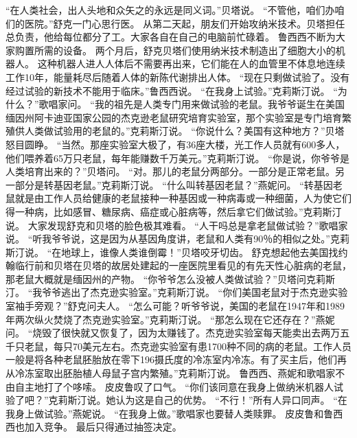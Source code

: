 \documentclass[a4paper,12pt,UTF8,twoside]{ctexbook}
\begin{document}
        “在人类社会，出人头地和众矢之的永远是同义词。”贝塔说。  
        “不管他，咱们办咱们的医院。”舒克一门心思行医。  
        从第二天起，朋友们开始攻纳米技术。贝塔担任总负责，他给每位都分了工。大家各自在自己的电脑前忙碌着。  
        鲁西西不断为大家购置所需的设备。  
        两个月后，舒克贝塔们使用纳米技术制造出了细胞大小的机器人。  
        这种机器人进人人体后不需要再出来，它们能在人的血管里不体息地连续工作10年，能量耗尽后随着人体的新陈代谢排出人体。  
        “现在只剩做试验了。没有经过试验的新技术不能用于临床。”鲁西西说。        
        “在我身上试验。”克莉斯汀说。  
        “为什么？”歌唱家问。  
        “我的祖先是人类专门用来做试验的老鼠。我爷爷诞生在美国缅因州阿卡迪亚国家公园的杰克逊老鼠研究培育实验室，那个实验室是专门培育繁殖供人类做试验用的老鼠的。”克莉斯汀说。  
        “你说什么？美国有这种地方？”贝塔怒目圆睁。  
        “当然。那座实验室大极了，有36座大楼，光工作人员就有600多人，他们喂养着65万只老鼠，每年能赚数千万美元。”克莉斯汀说。  
        “你是说，你爷爷是人类培育出来的？”贝塔问。  
        “对。那儿的老鼠分两部分。一部分是正常老鼠。另一部分是转基因老鼠。”克莉斯汀说。  
        “什么叫转基因老鼠？”燕妮问。  
        “转基因老鼠就是由工作人员给健康的老鼠接种一种基因或一种病毒或一种细菌，人为使它们得一种病，比如感冒、糖尿病、癌症或心脏病等，然后拿它们做试验。”克莉斯汀说。  
        大家发现舒克和贝塔的脸色极其难看。  
        “人干吗总是拿老鼠做试验？”歌唱家说。  
        “听我爷爷说，这是因为从基因角度讲，老鼠和人类有90％的相似之处。”克莉斯汀说。  
        “在地球上，谁像人类谁倒霉！”贝塔咬牙切齿。  
        舒克想起他去美国找约翰临行前和贝塔在贝塔的故居处建起的一座医院里看见的有先天性心脏病的老鼠，那老鼠大概就是缅因州的产物。  
        “你爷爷怎么没被人类做试验？”贝塔问克莉斯汀。  
        “我爷爷逃出了杰克逊实验室。”克莉斯汀说。  
        “你们美国老鼠对于杰克逊实验室袖手旁观？”舒克问夫人。  
        “怎么可能？听爷爷说，美国的老鼠在1947年和1989年两次纵火焚烧了杰克逊实验室。”克莉斯汀说。  
        “那怎么现在它还存在？”燕妮问。  
        “烧毁了很快就又恢复了，因为太赚钱了。杰克逊实验室每天能卖出去两万五千只老鼠，每只70美元左右。杰克逊实验室有患1700种不同的病的老鼠。工作人员一般是将各种老鼠胚胎放在零下196摄氏度的冷冻室内冷冻。有了买主后，他们再从冷冻室取出胚胎植人母鼠子宫内繁殖。”克莉斯汀说。  
        鲁西西、燕妮和歌唱家不由自主地打了个哆嗦。  
        皮皮鲁叹了口气。  
        “你们该同意在我身上做纳米机器人试验了吧？”克莉斯汀说。她认为这是自己的优势。  
        “不行！”所有人异口同声。  
        “在我身上做试验。”燕妮说。  
        “在我身上做。”歌唱家也要替人类赎罪。        
        皮皮鲁和鲁西西也加入竞争。  
        最后只得通过抽签决定。  
\end{document}
